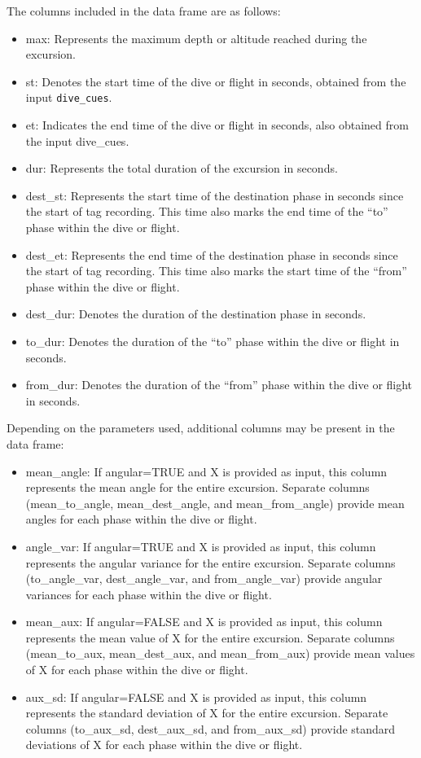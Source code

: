 The columns included in the data frame are as follows:

\begin{itemize}
\tightlist
\item
  max: Represents the maximum depth or altitude reached during the excursion.
\item
  st: Denotes the start time of the dive or flight in seconds, obtained from the input \texttt{dive\_cues}.
\item
  et: Indicates the end time of the dive or flight in seconds, also obtained from the input dive\_cues.
\item
  dur: Represents the total duration of the excursion in seconds.
\item
  dest\_st: Represents the start time of the destination phase in seconds since the start of tag recording. This time also marks the end time of the ``to'' phase within the dive or flight.
\item
  dest\_et: Represents the end time of the destination phase in seconds since the start of tag recording. This time also marks the start time of the ``from'' phase within the dive or flight.
\item
  dest\_dur: Denotes the duration of the destination phase in seconds.
\item
  to\_dur: Denotes the duration of the ``to'' phase within the dive or flight in seconds.
\item
  from\_dur: Denotes the duration of the ``from'' phase within the dive or flight in seconds.
\end{itemize}

Depending on the parameters used, additional columns may be present in the data frame:

\begin{itemize}
\tightlist
\item
  mean\_angle: If angular=TRUE and X is provided as input, this column represents the mean angle for the entire excursion. Separate columns (mean\_to\_angle, mean\_dest\_angle, and mean\_from\_angle) provide mean angles for each phase within the dive or flight.
\item
  angle\_var: If angular=TRUE and X is provided as input, this column represents the angular variance for the entire excursion. Separate columns (to\_angle\_var, dest\_angle\_var, and from\_angle\_var) provide angular variances for each phase within the dive or flight.
\item
  mean\_aux: If angular=FALSE and X is provided as input, this column represents the mean value of X for the entire excursion. Separate columns (mean\_to\_aux, mean\_dest\_aux, and mean\_from\_aux) provide mean values of X for each phase within the dive or flight.
\item
  aux\_sd: If angular=FALSE and X is provided as input, this column represents the standard deviation of X for the entire excursion. Separate columns (to\_aux\_sd, dest\_aux\_sd, and from\_aux\_sd) provide standard deviations of X for each phase within the dive or flight.
\end{itemize}

